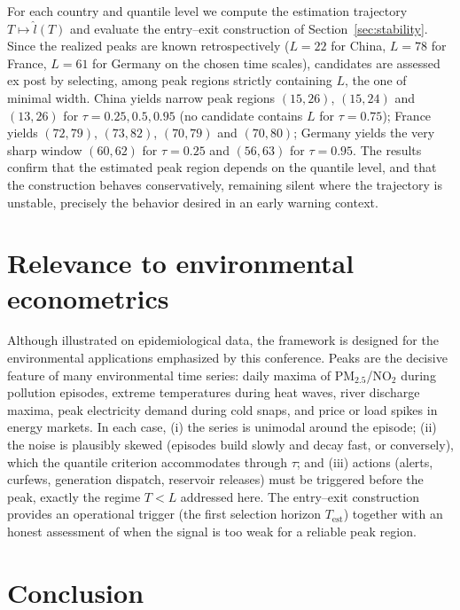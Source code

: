 \documentclass[11pt,a4paper]{article}
\begin{document}
For each country and quantile level we compute the estimation trajectory
$T\mapsto\hat l(T)$ and evaluate the entry--exit construction of
Section~\ref{sec:stability}. Since the realized peaks are known
retrospectively ($L=22$ for China, $L=78$ for France, $L=61$ for Germany on
the chosen time scales), candidates are assessed ex post by selecting, among
peak regions strictly containing $L$, the one of minimal width. China yields
narrow peak regions $(15,26)$, $(15,24)$ and $(13,26)$ for
$\tau=0.25,0.5,0.95$ (no candidate contains $L$ for $\tau=0.75$); France
yields $(72,79)$, $(73,82)$, $(70,79)$ and $(70,80)$; Germany yields the very
sharp window $(60,62)$ for $\tau=0.25$ and $(56,63)$ for $\tau=0.95$. The
results confirm that the estimated peak region depends on the quantile level,
and that the construction behaves conservatively, remaining silent where
the trajectory is unstable, precisely the behavior desired in an early
warning context.

\section{Relevance to environmental econometrics}
\label{sec:environment}

Although illustrated on epidemiological data, the framework is designed for
the environmental applications emphasized by this conference. Peaks are the
decisive feature of many environmental time series: daily maxima of
PM$_{2.5}$/NO$_2$ during pollution episodes, extreme temperatures during heat
waves, river discharge maxima, peak electricity demand during cold snaps, and
price or load spikes in energy markets. In each case, (i) the series is
unimodal around the episode; (ii) the noise is plausibly skewed (episodes
build slowly and decay fast, or conversely), which the quantile criterion
accommodates through $\tau$; and (iii) actions (alerts, curfews, generation
dispatch, reservoir releases) must be triggered before the peak, exactly
the regime $T<L$ addressed here. The entry--exit construction provides an
operational trigger (the first selection horizon $T_{\mathrm{est}}$) together
with an honest assessment of when the signal is too weak for a reliable peak
region. 

\section{Conclusion}
\label{sec:conclusion}
\end{document}
